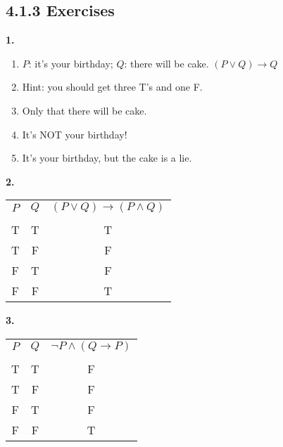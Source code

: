 \documentclass[10pt,]{book}
\theoremstyle{plain}
\theoremstyle{definition}
\theoremstyle{definition}
\theoremstyle{definition}
\numberwithin{equation}{chapter}
\newcommand{\hrulethin}  {\noalign{\hrule height 0.04em}}
\def\imp{\rightarrow}
\begin{document}
\subsection*{4.1.3 Exercises}
\noindent\textbf{1.}\quad{}\leavevmode%
\begin{enumerate}[label=(\alph*)]
\item\hypertarget{li-1050}{}\(P\): it's your birthday; \(Q\): there will be cake. \((P \vee Q) \imp Q\)%
\item\hypertarget{li-1051}{}
                  Hint: you should get three T's and one F.
\item\hypertarget{li-1052}{}
                  Only that there will be cake.
\item\hypertarget{li-1053}{}
                  It's NOT your birthday!
\item\hypertarget{li-1054}{}
                  It's your birthday, but the cake is a lie.
\end{enumerate}
\par\smallskip
\noindent\textbf{2.}\quad{}\leavevmode%
\begin{table}
\centering
\begin{tabular}{ccc}
\(P\)&\(Q\)&\((P \vee Q) \imp (P \wedge Q)\)\tabularnewline[0pt]
&&\tabularnewline\hrulethin
T&T&T\tabularnewline[0pt]
T&F&F\tabularnewline[0pt]
F&T&F\tabularnewline[0pt]
F&F&T
\end{tabular}
\end{table}
\par\smallskip
\noindent\textbf{3.}\quad{}\leavevmode%
\begin{table}
\centering
\begin{tabular}{ccc}
\(P\)&\(Q\)&\(\neg P \wedge (Q \imp P)\)\tabularnewline[0pt]
&&\tabularnewline\hrulethin
T&T&F\tabularnewline[0pt]
T&F&F\tabularnewline[0pt]
F&T&F\tabularnewline[0pt]
F&F&T
\end{tabular}
\end{table}
\end{document}
